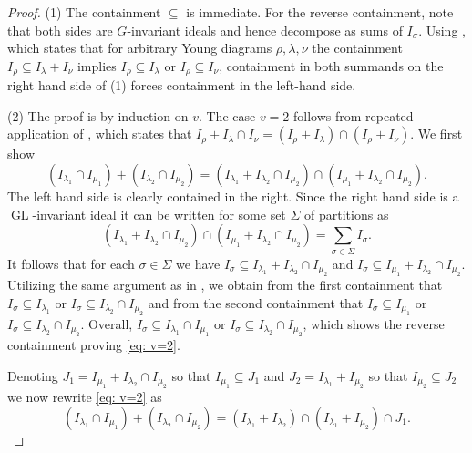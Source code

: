 \documentclass[11pt, reqno]{amsart}
\numberwithin{equation}{section}
\theoremstyle{definition}
\DeclareMathOperator{\GL}{GL}
\renewcommand{\l}{\lambda}
\newcommand{\s}{\sigma}
\begin{document}
\begin{proof}
(1) The containment $\subseteq$ is immediate.
For the reverse containment, note that both sides are $G$-invariant ideals and hence decompose as sums of $I_\sigma$.
Using \cite[Lemma~7.4]{WhiteheadThesis}, which states that for arbitrary Young diagrams $\rho, \lambda, \nu$ the containment $I_\rho\subseteq I_\l+I_\nu$ implies $I_\rho\subseteq I_\l$ or $I_\rho\subseteq I_\nu$, containment in both summands on the right hand side of (1) forces containment in the left-hand side.

(2) The proof is by induction on $v$.
The case $v=2$ follows from repeated application of \cite[Lemma~7.5]{WhiteheadThesis}, which states that $I_\rho+I_\l\cap I_\nu=(I_\rho+I_\l)\cap (I_\rho+I_\nu)$.
We  first show
		\begin{equation}\label{eq: v=2}
			(I_{\l_1}\cap I_{\mu_1})+ (I_{\l_2}\cap I_{\mu_2})=(I_{\l_1}+I_{\l_2}\cap I_{\mu_2})\cap  (I_{\mu_1}+ I_{\l_2}\cap I_{\mu_2}).
		\end{equation}
		The left hand side is clearly contained in the right. Since the right hand side is a $\GL$-invariant ideal it can be written for some set $\Sigma$ of partitions as
		\[
		(I_{\l_1}+I_{\l_2}\cap I_{\mu_2})\cap  (I_{\mu_1}+ I_{\l_2}\cap I_{\mu_2})=\sum_{\sigma\in \Sigma} I_\sigma.
		\]
		It follows that for each $\s\in \Sigma$ we have $I_\s\subseteq I_{\l_1}+I_{\l_2}\cap I_{\mu_2}$ and $I_\s\subseteq I_{\mu_1}+ I_{\l_2}\cap I_{\mu_2}$. Utilizing the same argument as in \cite[Lemma  7.4]{WhiteheadThesis}, we obtain from the first containment that $I_\s\subseteq I_{\l_1}$ or $I_\s\subseteq I_{\l_2}\cap I_{\mu_2}$ and from the second containment that $I_\s\subseteq I_{\mu_1}$ or $I_\s\subseteq I_{\l_2}\cap I_{\mu_2}$. Overall, $I_\s\subseteq I_{\l_1}\cap I_{\mu_1} $ or $I_\s\subseteq I_{\l_2}\cap I_{\mu_2}$, which shows the reverse containment proving  \eqref{eq: v=2}.

		Denoting $J_1=I_{\mu_1}+ I_{\l_2}\cap I_{\mu_2}$ so that $I_{\mu_1}\subseteq J_1$ and  $J_2=I_{\l_1}+I_{\mu_2}$ so that $I_{\mu_2}\subseteq J_2$ we now rewrite \eqref{eq: v=2} as
		\[
		(I_{\l_1}\cap I_{\mu_1})+ (I_{\l_2}\cap I_{\mu_2})=(I_{\l_1}+I_{\l_2})\cap (I_{\l_1}+I_{\mu_2})\cap J_1.
		\]


\end{proof}
\end{document}

